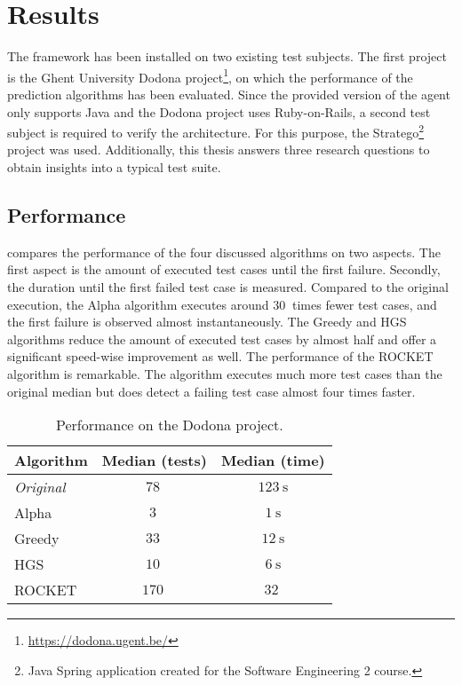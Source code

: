 \section{Results}
\noindent The framework has been installed on two existing test subjects. The first project is the Ghent University Dodona project\footnote{\url{https://dodona.ugent.be/}}, on which the performance of the prediction algorithms has been evaluated. Since the provided version of the agent only supports Java and the Dodona project uses Ruby-on-Rails, a second test subject is required to verify the architecture. For this purpose, the Stratego\footnote{Java Spring application created for the Software Engineering 2 course.} project was used. Additionally, this thesis answers three research questions to obtain insights into a typical test suite.

\subsection{Performance}
\noindent {} compares the performance of the four discussed algorithms on two aspects. The first aspect is the amount of executed test cases until the first failure. Secondly, the duration until the first failed test case is measured. Compared to the original execution, the Alpha algorithm executes around $\SI{30}{}$ times fewer test cases, and the first failure is observed almost instantaneously. The Greedy and HGS algorithms reduce the amount of executed test cases by almost half and offer a significant speed-wise improvement as well. The performance of the ROCKET algorithm is remarkable. The algorithm executes much more test cases than the original median but does detect a failing test case almost four times faster.

\begin{table}[h]
	\centering
	\begin{tabularx}{\columnwidth}{|X||c|c|}
		\hline
		\textbf{Algorithm} & \textbf{Median (tests)} & \textbf{Median (time)}\\
		\hline
		\emph{Original} & $\SI{78}{}$ & $\SI{123}{\second}$\\
		
		\hline
		
		Alpha & $\SI{3}{}$ & $\SI{1}{\second}$\\
		
		Greedy & $\SI{33}{}$ & $\SI{12}{\second}$\\
		
		HGS & $\SI{10}{}$ & $\SI{6}{\second}$\\
		
		ROCKET & $\SI{170}{}$ & $\SI{32}{}$\\
		
		\hline
	\end{tabularx}
	\caption{Performance on the Dodona project.}
	\label{tbl:performance-dodona}
\end{table}

